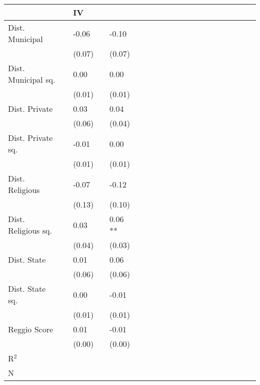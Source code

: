 \begin{tabular}{l L{1cm} l L{1cm} l}
\toprule
 & & IV \\
\midrule
Dist. Municipal & & -0.06 & & -0.10 \\
& & (0.07) & & (0.07) \\
Dist. Municipal sq. & & 0.00 & & 0.00 \\
& & (0.01) & & (0.01) \\
Dist. Private & & 0.03 & & 0.04 \\
& & (0.06) & & (0.04) \\
Dist. Private sq. & & -0.01 & & 0.00 \\
& & (0.01) & & (0.01) \\
Dist. Religious & & -0.07 & & -0.12 \\
& & (0.13) & & (0.10) \\
Dist. Religious sq. & & 0.03 & & 0.06 ** \\
& & (0.04) & & (0.03) \\
Dist. State & & 0.01 & & 0.06 \\
& & (0.06) & & (0.06) \\
Dist. State sq. & & 0.00 & & -0.01 \\
& & (0.01) & & (0.01) \\
Reggio Score & & 0.01 & & -0.01 \\
& & (0.00) & & (0.00) \\
\midrule
R$^2$ & & & & & & & & & & & & & & & & & & & & \\
N & & & & & & & & & & & & & & & & & & & & \\
\bottomrule
\end{tabular}
